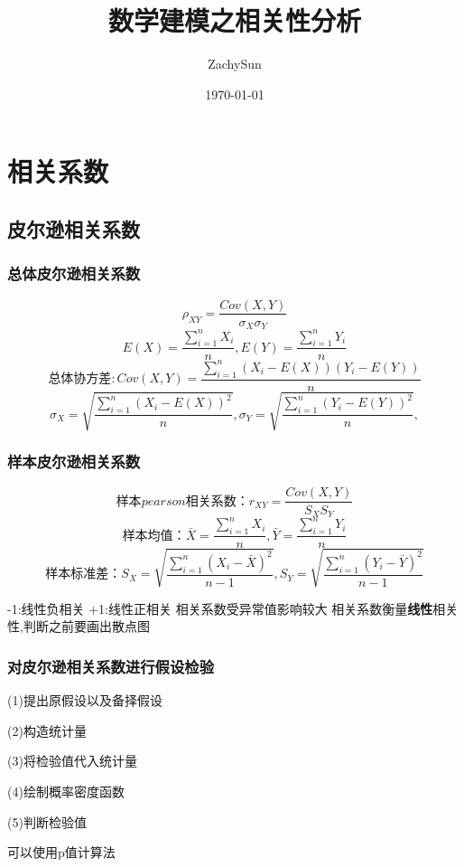 \documentclass{article}
\title{数学建模之相关性分析}
\date{\today}
\author{ZachySun}
\begin{document}
\maketitle
\section{相关系数}

\subsection{皮尔逊相关系数}
\subsubsection{总体皮尔逊相关系数}

$$
\rho _{XY}=\frac{Cov\left( X,Y \right)}{\sigma _X\sigma _Y}
$$
$$
E\left( X \right) =\frac{\sum_{i=1}^n{X_i}}{n},E\left( Y \right) =\frac{\sum_{i=1}^n{Y_i}}{n}
$$
$$
\text{总体协方差}:Cov\left( X,Y \right) =\frac{\sum_{i=1}^n{\left( X_i-E\left( X \right) \right) \left( Y_i-E\left( Y \right) \right)}}{n}
$$
$$
\sigma _X=\sqrt{\frac{\sum_{i=1}^n{\left( X_i-E\left( X \right) \right) ^2}}{n}},\sigma _Y=\sqrt{\frac{\sum_{i=1}^n{\left( Y_i-E\left( Y \right) \right) ^2}}{n}},
$$

\subsubsection{样本皮尔逊相关系数}
$$
\text{样本}pearson\text{相关系数：}r_{XY}=\frac{Cov\left( X,Y \right)}{S_XS_Y}
$$
$$
\text{样本均值：}\bar{X}=\frac{\sum_{i=1}^n{X_i}}{n},\bar{Y}=\frac{\sum_{i=1}^n{Y_i}}{n}
$$
$$
\text{样本标准差：}S_X=\sqrt{\frac{\sum_{i=1}^n{\left( X_i-\bar{X} \right) ^2}}{n-1}},S_Y=\sqrt{\frac{\sum_{i=1}^n{\left( Y_i-\bar{Y} \right) ^2}}{n-1}}
$$

-1:线性负相关
+1:线性正相关
相关系数受异常值影响较大
相关系数衡量\textbf{线性}相关性,判断之前要画出散点图


\subsubsection{对皮尔逊相关系数进行假设检验}
(1)提出原假设以及备择假设

(2)构造统计量

(3)将检验值代入统计量

(4)绘制概率密度函数

(5)判断检验值

可以使用p值计算法
\end{document}
